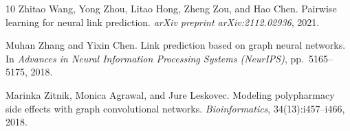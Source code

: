 \documentclass{article}
\begin{document}
\begin{thebibliography}{10}
Zhitao Wang, Yong Zhou, Litao Hong, Zheng Zou, and Hao Chen.
\newblock Pairwise learning for neural link prediction.
\newblock \emph{arXiv preprint arXiv:2112.02936}, 2021.

Muhan Zhang and Yixin Chen.
\newblock Link prediction based on graph neural networks.
\newblock In \emph{Advances in Neural Information Processing Systems (NeurIPS)}, pp.\ 5165--5175, 2018.

Marinka Zitnik, Monica Agrawal, and Jure Leskovec.
\newblock Modeling polypharmacy side effects with graph convolutional networks.
\newblock \emph{Bioinformatics}, 34(13):i457--i466, 2018.

\end{thebibliography}
\end{document}
